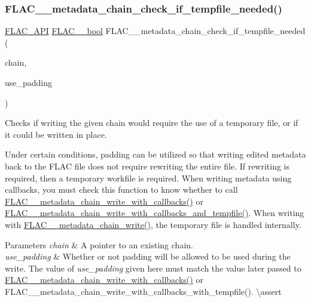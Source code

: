 \subsubsection{\texorpdfstring{FLAC\_\_metadata\_chain\_check\_if\_tempfile\_needed()}{FLAC\_\_metadata\_chain\_check\_if\_tempfile\_needed()}}
{\footnotesize\ttfamily \mbox{\hyperlink{group__flac__export_ga56ca07df8a23310707732b1c0007d6f5}{F\+L\+A\+C\+\_\+\+A\+PI}} \mbox{\hyperlink{ordinals_8h_a95103469f1cbd78b8cf250194985b34e}{F\+L\+A\+C\+\_\+\+\_\+bool}} F\+L\+A\+C\+\_\+\+\_\+metadata\+\_\+chain\+\_\+check\+\_\+if\+\_\+tempfile\+\_\+needed (\begin{DoxyParamCaption}\item[{\mbox{\hyperlink{group__flac__metadata__level2_gaec6993c60b88f222a52af86f8f47bfdf}{F\+L\+A\+C\+\_\+\+\_\+\+Metadata\+\_\+\+Chain}} $\ast$}]{chain,  }\item[{\mbox{\hyperlink{ordinals_8h_a95103469f1cbd78b8cf250194985b34e}{F\+L\+A\+C\+\_\+\+\_\+bool}}}]{use\+\_\+padding }\end{DoxyParamCaption})}

Checks if writing the given chain would require the use of a temporary file, or if it could be written in place.

Under certain conditions, padding can be utilized so that writing edited metadata back to the F\+L\+AC file does not require rewriting the entire file. If rewriting is required, then a temporary workfile is required. When writing metadata using callbacks, you must check this function to know whether to call \mbox{\hyperlink{group__flac__metadata__level2_ga6bf7552940ec2242718d1ab164b89e03}{F\+L\+A\+C\+\_\+\+\_\+metadata\+\_\+chain\+\_\+write\+\_\+with\+\_\+callbacks()}} or \mbox{\hyperlink{group__flac__metadata__level2_ga371beab0d09d5248272bcb8d57de94f3}{F\+L\+A\+C\+\_\+\+\_\+metadata\+\_\+chain\+\_\+write\+\_\+with\+\_\+callbacks\+\_\+and\+\_\+tempfile()}}. When writing with \mbox{\hyperlink{group__flac__metadata__level2_gaa15ead7230217de8e79f4af822cda490}{F\+L\+A\+C\+\_\+\+\_\+metadata\+\_\+chain\+\_\+write()}}, the temporary file is handled internally.


\begin{DoxyParams}{Parameters}
{\em chain} & A pointer to an existing chain. \\
\hline
{\em use\+\_\+padding} & Whether or not padding will be allowed to be used during the write. The value of {\itshape use\+\_\+padding} given here must match the value later passed to \mbox{\hyperlink{group__flac__metadata__level2_ga6bf7552940ec2242718d1ab164b89e03}{F\+L\+A\+C\+\_\+\+\_\+metadata\+\_\+chain\+\_\+write\+\_\+with\+\_\+callbacks()}} or F\+L\+A\+C\+\_\+\+\_\+metadata\+\_\+chain\+\_\+write\+\_\+with\+\_\+callbacks\+\_\+with\+\_\+tempfile(). \textbackslash{}assert 
\begin{DoxyCode}{1}
\end{DoxyCode}
 \\
\hline
\end{DoxyParams}

